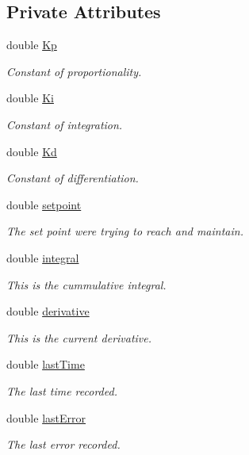 \subsection*{Private Attributes}
\begin{DoxyCompactItemize}
\item 
double \mbox{\hyperlink{class_p_i_d_controller_a04221df772b587731f0ad8e5525181ea}{Kp}}
\begin{DoxyCompactList}\small\item\em Constant of proportionality. \end{DoxyCompactList}\item 
double \mbox{\hyperlink{class_p_i_d_controller_a3b77d4d55fb7a40947b22be010e9754f}{Ki}}
\begin{DoxyCompactList}\small\item\em Constant of integration. \end{DoxyCompactList}\item 
double \mbox{\hyperlink{class_p_i_d_controller_a7cebd6dfe5a9d955523e89907f1b4854}{Kd}}
\begin{DoxyCompactList}\small\item\em Constant of differentiation. \end{DoxyCompactList}\item 
double \mbox{\hyperlink{class_p_i_d_controller_afd7c200aa64929404551b42f79931aca}{setpoint}}
\begin{DoxyCompactList}\small\item\em The set point we\textquotesingle{}re trying to reach and maintain. \end{DoxyCompactList}\item 
double \mbox{\hyperlink{class_p_i_d_controller_aace99d409fcb5c44628a0f435afb25e6}{integral}}
\begin{DoxyCompactList}\small\item\em This is the cummulative integral. \end{DoxyCompactList}\item 
double \mbox{\hyperlink{class_p_i_d_controller_aaf31f0adb542cb3bae0940dfd05b6640}{derivative}}
\begin{DoxyCompactList}\small\item\em This is the current derivative. \end{DoxyCompactList}\item 
double \mbox{\hyperlink{class_p_i_d_controller_a8cb565aa86e31cde944b3e9b360dd624}{last\+Time}}
\begin{DoxyCompactList}\small\item\em The last time recorded. \end{DoxyCompactList}\item 
double \mbox{\hyperlink{class_p_i_d_controller_aa58498d6e2cf616b5b04b0c4e561eb03}{last\+Error}}
\begin{DoxyCompactList}\small\item\em The last error recorded. \end{DoxyCompactList}\end{DoxyCompactItemize}


